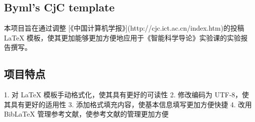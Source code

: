 \documentclass[10.5pt,compsoc]{CjC}
\theoremstyle{mystyle}
\begin{document}
\begin{table*}[!t]
\end{table*}
\clearpage\clearpage

\begin{strip}
\vspace {-13mm}
\end{strip}
\linespread{1.15}


{
  \begin{CJK*}{UTF8}{hei}
    \vskip 1mm
    \section{Byml's CjC template}
  \end{CJK*} 
}
本项目旨在通过调整 [《中国计算机学报》](http://cjc.ict.ac.cn/index.htm)的投稿 LaTeX 模板，使其更加能够更加方便地应用于《智能科学导论》实验课的实验报告撰写。

{
  \begin{CJK*}{UTF8}{hei}
    \subsection{项目特点}
  \end{CJK*}  
}
1. 对 LaTeX 模板手动格式化，使其具有更好的可读性
2. 修改编码为 UTF-8，使其具有更好的适用性
3. 添加格式填充内容，使基本信息填写更加方便快捷
4. 改用 BibLaTeX 管理参考文献，使参考文献的管理更加方便
\end{document}
